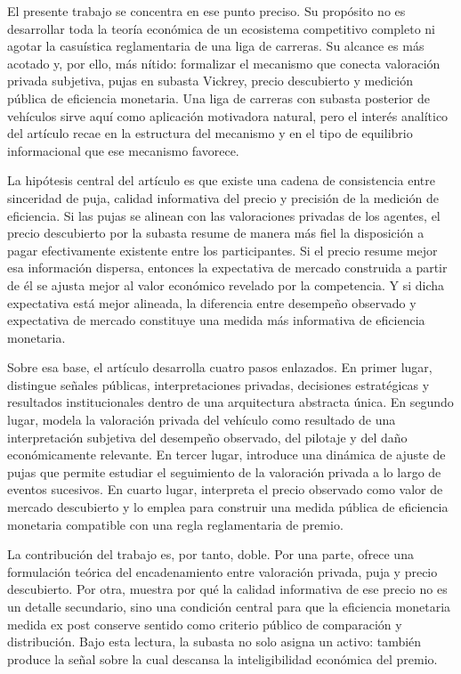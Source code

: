 \documentclass[11pt,a4paper]{article}
\theoremstyle{definition}
\begin{document}
El presente trabajo se concentra en ese punto preciso. Su propósito no es desarrollar toda la teoría económica de un ecosistema competitivo completo ni agotar la casuística reglamentaria de una liga de carreras. Su alcance es más acotado y, por ello, más nítido: formalizar el mecanismo que conecta valoración privada subjetiva, pujas en subasta Vickrey, precio descubierto y medición pública de eficiencia monetaria. Una liga de carreras con subasta posterior de vehículos sirve aquí como aplicación motivadora natural, pero el interés analítico del artículo recae en la estructura del mecanismo y en el tipo de equilibrio informacional que ese mecanismo favorece.

La hipótesis central del artículo es que existe una cadena de consistencia entre sinceridad de puja, calidad informativa del precio y precisión de la medición de eficiencia. Si las pujas se alinean con las valoraciones privadas de los agentes, el precio descubierto por la subasta resume de manera más fiel la disposición a pagar efectivamente existente entre los participantes. Si el precio resume mejor esa información dispersa, entonces la expectativa de mercado construida a partir de él se ajusta mejor al valor económico revelado por la competencia. Y si dicha expectativa está mejor alineada, la diferencia entre desempeño observado y expectativa de mercado constituye una medida más informativa de eficiencia monetaria.

Sobre esa base, el artículo desarrolla cuatro pasos enlazados. En primer lugar, distingue señales públicas, interpretaciones privadas, decisiones estratégicas y resultados institucionales dentro de una arquitectura abstracta única. En segundo lugar, modela la valoración privada del vehículo como resultado de una interpretación subjetiva del desempeño observado, del pilotaje y del daño económicamente relevante. En tercer lugar, introduce una dinámica de ajuste de pujas que permite estudiar el seguimiento de la valoración privada a lo largo de eventos sucesivos. En cuarto lugar, interpreta el precio observado como valor de mercado descubierto y lo emplea para construir una medida pública de eficiencia monetaria compatible con una regla reglamentaria de premio.

La contribución del trabajo es, por tanto, doble. Por una parte, ofrece una formulación teórica del encadenamiento entre valoración privada, puja y precio descubierto. Por otra, muestra por qué la calidad informativa de ese precio no es un detalle secundario, sino una condición central para que la eficiencia monetaria medida ex post conserve sentido como criterio público de comparación y distribución. Bajo esta lectura, la subasta no solo asigna un activo: también produce la señal sobre la cual descansa la inteligibilidad económica del premio.
\end{document}
